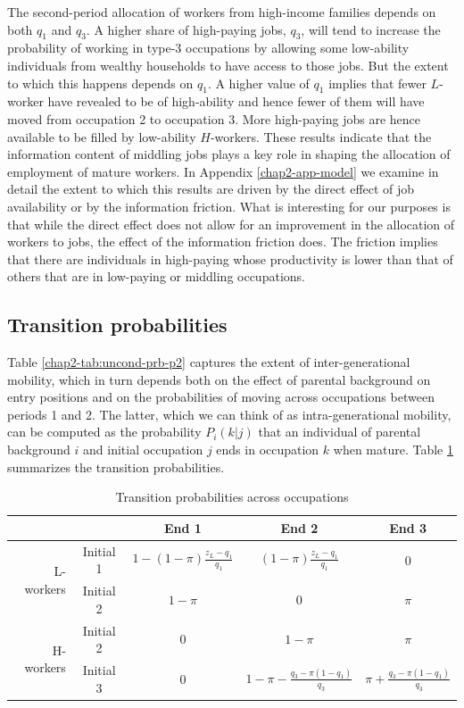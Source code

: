 The second-period allocation of workers from high-income families depends on both $q_{1}$ and $q_{3}$. A higher share of high-paying jobs, $q_{3}$, will tend to increase the probability of working in type-3 occupations by allowing some low-ability individuals from wealthy households to have access to those jobs. But the extent to which this happens depends on $q_{1}$. A higher value of $q_{1}$ implies that fewer $L$-worker have revealed to be of high-ability and hence fewer of them will have moved from occupation 2 to occupation 3. More high-paying jobs are hence available to be filled by low-ability $H$-workers. These results indicate that the information content of middling jobs plays a key role in shaping the allocation of employment of mature workers. In Appendix \ref{chap2-app-model} we examine in detail the extent to which this results are driven by the direct effect of job availability or by the information friction. What is interesting for our purposes is that while the direct effect does not allow for an improvement in the allocation of workers to jobs, the effect of the information friction does. The friction implies that there are individuals in high-paying whose productivity is lower than that of others that are in low-paying or middling occupations.


\subsection{Transition probabilities}

Table \ref{chap2-tab:uncond-prb-p2} captures the extent of inter-generational mobility, which in turn depends both on the effect of parental background on entry positions and on the probabilities of moving across occupations between periods 1 and 2. The latter, which we can think of as intra-generational mobility, can be computed as the probability $P_i(k|j)$ that an individual of parental background $i$ and initial occupation $j$ ends in occupation $k$ when mature. Table \ref{chap2-tab:trans-prb} summarizes the transition probabilities.  
\begin{table}[!htb]
    \setlength{\tabcolsep}{6pt}
    \setlength{\extrarowheight}{8pt}
    \caption{Transition probabilities across occupations}\label{chap2-tab:trans-prb}
    \centering
    \begin{tabular}{rcccc}
    \toprule
        & & End 1 & End 2 & End 3\\\midrule
         \multirow{2}{*}{L-workers} & Initial 1 & $1-(1-\pi)\frac{z_{L}-q_1}{q_1}$ & $(1-\pi )\frac{z_{L}-q_1}{q_{1}}$ & 0 \\
         & Initial 2 & $1-\pi$ & 0 & $\pi$ \\
         \midrule
         \multirow{2}{*}{H-workers} & Initial 2 & 0 & $1-\pi$ & $\pi$\\
         & Initial 3 & 0 & $1 - \pi - \frac{q_3 - \pi (1-q_{1}) }{q_{3}}$ & $\pi + \frac{q_3 - \pi (1-q_{1}) }{q_{3}}$\\
         \bottomrule
    \end{tabular}
\end{table}

